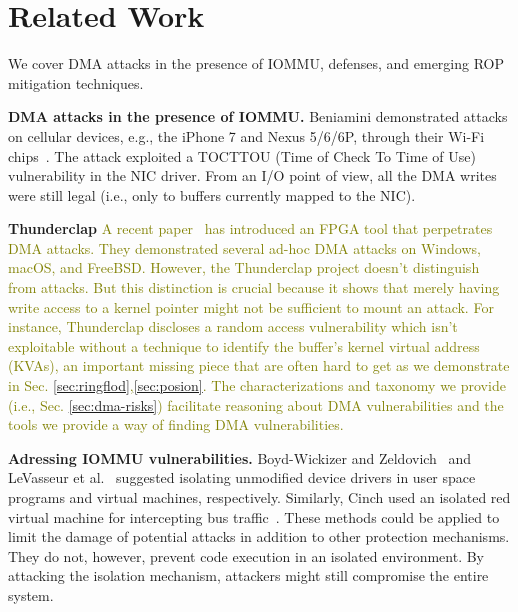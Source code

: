 \section{Related Work}
We cover DMA attacks in the presence of IOMMU, defenses, and emerging ROP mitigation techniques.

\smallskip
\noindent\textbf{DMA attacks in the presence of IOMMU.}
Beniamini demonstrated attacks on cellular devices, e.g., the iPhone 7 and Nexus 5/6/6P, through their Wi-Fi chips~\cite{Ben17a, Ben17b}. 
The attack exploited a TOCTTOU (Time of Check To Time of Use) vulnerability in the NIC driver. From an I/O point of view, all the DMA writes were still legal (i.e., only to buffers currently mapped to the NIC).

\noindent\textbf{Thunderclap} \textcolor{olive}{A recent paper~\cite{thunder} has introduced an FPGA tool that perpetrates \simple DMA attacks. They demonstrated several ad-hoc \simple DMA attacks on Windows, macOS, and FreeBSD. However, the Thunderclap project doesn't distinguish \simple from \compound attacks. But this distinction is crucial because it shows that merely having write access to a kernel pointer might not be sufficient to mount an attack. For instance, Thunderclap discloses a random access vulnerability which isn't exploitable without a technique to identify the buffer's kernel virtual address (KVAs), an important missing piece that are often hard to get as we demonstrate in Sec. \ref{sec:ringflod},\ref{sec:posion}. The characterizations and taxonomy we provide (i.e., Sec. \ref{sec:dma-risks}) facilitate reasoning about DMA vulnerabilities and the tools we provide a way of finding DMA vulnerabilities.}

\smallskip
\noindent\textbf{Adressing IOMMU vulnerabilities.}
Boyd-Wickizer and Zeldovich~\cite{BWZ10} and LeVasseur et al.~\cite{LUSG04} suggested isolating unmodified device drivers in user space programs and virtual machines, respectively. Similarly, Cinch used an isolated red virtual machine for intercepting bus traffic~\cite{AWH16}. These methods could be applied to limit the damage of potential attacks in addition to other protection mechanisms. They do not, however, prevent code execution in an isolated environment. By attacking the isolation mechanism, attackers might still compromise the entire system.

